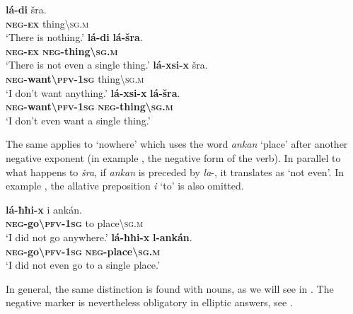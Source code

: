 \documentclass[output=paper,colorlinks,citecolor=brown]{langscibook}
\begin{document}
\ea\label{ex:siw:54}
    \ea\label{ex:siw:54a}
        \gll \textbf{lá-di} šra. \\ 
             \textbf{\textsc{neg-ex}} thing{\textbackslash}\textsc{sg.m} \\
        \glt ‘There is nothing.’
    \ex\label{ex:siw:54b}
        \gll \textbf{lá-di} \textbf{lá-šra}. \\
             \textbf{\textsc{neg}-\textsc{ex}} \textbf{\textsc{neg}-thing{\textbackslash}\textsc{sg.m}} \\
        \glt ‘There is not even a single thing.’
    \ex\label{ex:siw:54c}
        \gll \textbf{lá-xsi-x} šra. \\
             \textbf{\textsc{neg}-want{\textbackslash}\textsc{pfv}-\textsc{1sg}} thing{\textbackslash}\textsc{sg.m} \\
        \glt ‘I don’t want anything.’
    \ex\label{ex:siw:54d}
        \gll \textbf{lá-xsi-x} \textbf{lá-šra}. \\
             \textbf{\textsc{neg}-want{\textbackslash}\textsc{pfv}-\textsc{1sg}} \textbf{\textsc{neg}-thing{\textbackslash}\textsc{sg.m}} \\
        \glt ‘I don’t even want a single thing.’
    \z
\z

The same applies to ‘nowhere’ which uses the word \textit{ankan} ‘place’ after another negative exponent (in example , the negative form of the verb). In parallel to what happens to \textit{šra}, if \textit{ankan} is preceded by \textit{la}{}-, it translates as ‘not even’. In example , the allative preposition \textit{i} ‘to’ is also omitted.

\ea\label{ex:siw:55}
    \ea\label{ex:siw:55a}
        \gll \textbf{lá-ħħi-x} i ankán. \\ 
             \textbf{\textsc{neg}-go{\textbackslash}\textsc{pfv}-\textsc{1sg}} to place{\textbackslash}\textsc{sg.m} \\
        \glt ‘I did not go anywhere.’
    \ex\label{ex:siw:55b}
        \gll \textbf{lá-ħħi-x} \textbf{l-ankán}. \\
             \textbf{\textsc{neg}-go{\textbackslash}\textsc{pfv}-\textsc{1sg}} \textbf{\textsc{neg}-place{\textbackslash}\textsc{sg}.\textsc{m}} \\
        \glt ‘I did not even go to a single place.’
    \z
\z 


In general, the same distinction is found with nouns, as we will see in .
The negative marker is nevertheless obligatory in elliptic answers, see .
\end{document}
